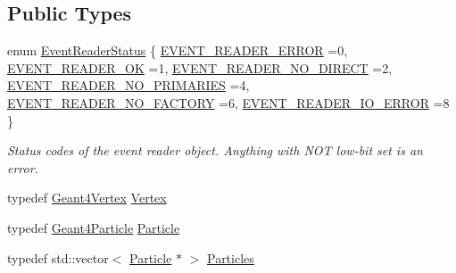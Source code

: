 \subsection*{Public Types}
\begin{DoxyCompactItemize}
\item 
enum \hyperlink{class_d_d4hep_1_1_simulation_1_1_geant4_event_reader_ae4f4bc83ffcf5b0c1868ad78859851e7}{Event\+Reader\+Status} \{ \newline
\hyperlink{class_d_d4hep_1_1_simulation_1_1_geant4_event_reader_ae4f4bc83ffcf5b0c1868ad78859851e7aaeb5bf886e4f7638fadf42796cd8b771}{E\+V\+E\+N\+T\+\_\+\+R\+E\+A\+D\+E\+R\+\_\+\+E\+R\+R\+OR} =0, 
\hyperlink{class_d_d4hep_1_1_simulation_1_1_geant4_event_reader_ae4f4bc83ffcf5b0c1868ad78859851e7a13d6e75077901770699fb70535bd24f5}{E\+V\+E\+N\+T\+\_\+\+R\+E\+A\+D\+E\+R\+\_\+\+OK} =1, 
\hyperlink{class_d_d4hep_1_1_simulation_1_1_geant4_event_reader_ae4f4bc83ffcf5b0c1868ad78859851e7ae95cba86bedc0b790fd088cadd03f0ad}{E\+V\+E\+N\+T\+\_\+\+R\+E\+A\+D\+E\+R\+\_\+\+N\+O\+\_\+\+D\+I\+R\+E\+CT} =2, 
\hyperlink{class_d_d4hep_1_1_simulation_1_1_geant4_event_reader_ae4f4bc83ffcf5b0c1868ad78859851e7a0f764338e1ac94712d2d957cda746d0d}{E\+V\+E\+N\+T\+\_\+\+R\+E\+A\+D\+E\+R\+\_\+\+N\+O\+\_\+\+P\+R\+I\+M\+A\+R\+I\+ES} =4, 
\newline
\hyperlink{class_d_d4hep_1_1_simulation_1_1_geant4_event_reader_ae4f4bc83ffcf5b0c1868ad78859851e7ad87b1d312f8a452aa2e351a5b6939af4}{E\+V\+E\+N\+T\+\_\+\+R\+E\+A\+D\+E\+R\+\_\+\+N\+O\+\_\+\+F\+A\+C\+T\+O\+RY} =6, 
\hyperlink{class_d_d4hep_1_1_simulation_1_1_geant4_event_reader_ae4f4bc83ffcf5b0c1868ad78859851e7a228cd68e3e7f8d4562f18996cae80e46}{E\+V\+E\+N\+T\+\_\+\+R\+E\+A\+D\+E\+R\+\_\+\+I\+O\+\_\+\+E\+R\+R\+OR} =8
 \}\begin{DoxyCompactList}\small\item\em Status codes of the event reader object. Anything with N\+OT low-\/bit set is an error. \end{DoxyCompactList}
\item 
typedef \hyperlink{class_d_d4hep_1_1_simulation_1_1_geant4_vertex}{Geant4\+Vertex} \hyperlink{class_d_d4hep_1_1_simulation_1_1_geant4_event_reader_ac9738208fe520e5aa2ad1efa13de82e7}{Vertex}
\item 
typedef \hyperlink{class_d_d4hep_1_1_simulation_1_1_geant4_particle}{Geant4\+Particle} \hyperlink{class_d_d4hep_1_1_simulation_1_1_geant4_event_reader_ad37f7aa722da2299517d66b4568a6a4a}{Particle}
\item 
typedef std\+::vector$<$ \hyperlink{class_d_d4hep_1_1_simulation_1_1_geant4_event_reader_ad37f7aa722da2299517d66b4568a6a4a}{Particle} $\ast$ $>$ \hyperlink{class_d_d4hep_1_1_simulation_1_1_geant4_event_reader_afa252e93d319aef2810a17aa78bb4603}{Particles}
\end{DoxyCompactItemize}
